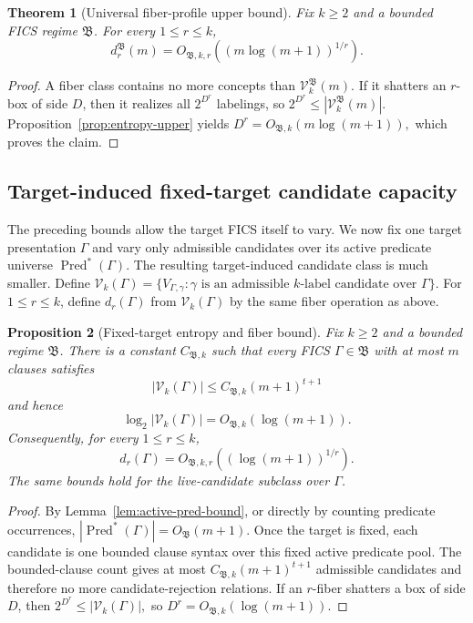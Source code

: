 \documentclass[11pt]{article}
\newtheorem{theorem}{Theorem}[section]
\newtheorem{proposition}[theorem]{Proposition}
\theoremstyle{definition}
\theoremstyle{remark}
\newcommand{\Pred}{\operatorname{Pred}}
\begin{document}
\begin{theorem}[Universal fiber-profile upper bound]
\label{thm:fiber-upper}
Fix \(k\ge2\) and a bounded FICS regime \(\mathfrak B\). For every
\(1\le r\le k\),
\[
d_r^{\mathfrak B}(m)
=
O_{\mathfrak B,k,r}\!\left((m\log(m+1))^{1/r}\right).
\]
\end{theorem}

\begin{proof}
A fiber class contains no more concepts than
\(\mathcal V_k^{\mathfrak B}(m)\). If it shatters an \(r\)-box of side \(D\),
then it realizes all \(2^{D^r}\) labelings, so
\(2^{D^r}\le |\mathcal V_k^{\mathfrak B}(m)|.\)
Proposition~\ref{prop:entropy-upper} yields
\(D^r=O_{\mathfrak B,k}(m\log(m+1)),\)
which proves the claim.
\end{proof}


\subsection{Target-induced fixed-target candidate capacity}

The preceding bounds allow the target FICS itself to vary.  We now fix one
target presentation \(\Gamma\) and vary only admissible candidates over its
active predicate universe \(\Pred^\ast(\Gamma)\).  The resulting
target-induced candidate class is much smaller.  Define
\(\mathcal V_k(\Gamma) = \{V_{\Gamma,\gamma}:\gamma\text{ is an admissible }k\text{-label candidate over }\Gamma\}.\)
For \(1\le r\le k\), define \(d_r(\Gamma)\) from
\(\mathcal V_k(\Gamma)\) by the same fiber operation as above.

\begin{proposition}[Fixed-target entropy and fiber bound]
\label{prop:fixed-target}
Fix \(k\ge2\) and a bounded regime \(\mathfrak B\).  There is a constant
\(C_{\mathfrak B,k}\) such that every FICS \(\Gamma\in\mathfrak B\) with at
most \(m\) clauses satisfies
\[
|\mathcal V_k(\Gamma)|
\le
C_{\mathfrak B,k}(m+1)^{t+1}
\]
and hence
\[
\log_2|\mathcal V_k(\Gamma)|
=
O_{\mathfrak B,k}(\log(m+1)).
\]
Consequently, for every \(1\le r\le k\),
\[
\boxed{
d_r(\Gamma)
=
O_{\mathfrak B,k,r}\!\left((\log(m+1))^{1/r}\right).
}
\]
The same bounds hold for the live-candidate subclass over \(\Gamma\).
\end{proposition}

\begin{proof}
By Lemma~\ref{lem:active-pred-bound}, or directly by counting predicate
occurrences, \(|\Pred^\ast(\Gamma)|=O_{\mathfrak B}(m+1)\).  Once the target is
fixed, each candidate is one bounded clause syntax over this fixed active
predicate pool.  The bounded-clause count gives at most
\(C_{\mathfrak B,k}(m+1)^{t+1}\) admissible candidates and therefore no more
candidate-rejection relations.  If an \(r\)-fiber shatters a box of side
\(D\), then
\(2^{D^r}\le |\mathcal V_k(\Gamma)|,\)
so \(D^r=O_{\mathfrak B,k}(\log(m+1))\).
\end{proof}
\end{document}
